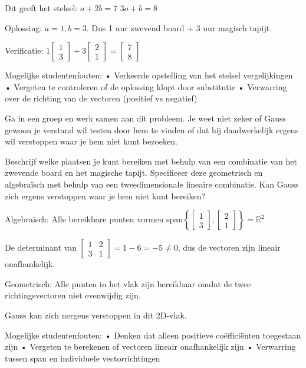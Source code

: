\documentclass{ximera}
\begin{document}
\begin{problem}
\begin{freeResponse}
Dit geeft het stelsel:
$a + 2b = 7$
$3a + b = 8$

Oplossing: $a = 1, b = 3$. Dus 1 uur zwevend board + 3 uur magisch tapijt.

Verificatie: $1\begin{bmatrix} 1 \\ 3 \end{bmatrix} + 3\begin{bmatrix} 2 \\ 1 \end{bmatrix} = \begin{bmatrix} 7 \\ 8 \end{bmatrix}$

Mogelijke studentenfouten:
• Verkeerde opstelling van het stelsel vergelijkingen
• Vergeten te controleren of de oplossing klopt door substitutie
• Verwarring over de richting van de vectoren (positief vs negatief)
\end{freeResponse}
\end{problem}

\begin{problem}
Ga in een groep en werk samen aan dit probleem. Je weet niet zeker of Gauss gewoon je verstand wil testen door hem te vinden of dat hij daadwerkelijk ergens wil verstoppen waar je hem niet kunt bezoeken.

Beschrijf welke plaatsen je kunt bereiken met behulp van een combinatie van het zwevende board en het magische tapijt. Specificeer deze geometrisch en algebraïsch met behulp van een tweedimensionale lineaire combinatie. Kan Gauss zich ergens verstoppen waar je hem niet kunt bereiken?

\begin{freeResponse}
Algebraïsch: Alle bereikbare punten vormen $\text{span}\left\{\begin{bmatrix} 1 \\ 3 \end{bmatrix}, \begin{bmatrix} 2 \\ 1 \end{bmatrix}\right\} = \mathbb{R}^2$

De determinant van $\begin{bmatrix} 1 & 2 \\ 3 & 1 \end{bmatrix} = 1-6 = -5 \neq 0$, dus de vectoren zijn lineair onafhankelijk.

Geometrisch: Alle punten in het vlak zijn bereikbaar omdat de twee richtingsvectoren niet evenwijdig zijn.

Gauss kan zich nergens verstoppen in dit 2D-vlak.

Mogelijke studentenfouten:
• Denken dat alleen positieve coëfficiënten toegestaan zijn
• Vergeten te berekenen of vectoren lineair onafhankelijk zijn
• Verwarring tussen span en individuele vectorrichtingen
\end{freeResponse}
\end{problem}
\end{document}
